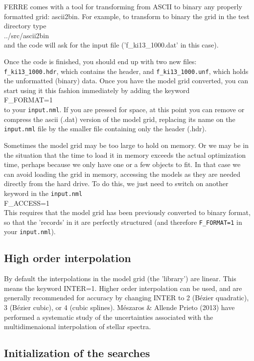 \documentclass[12pt]{article}
\begin{document}
FERRE comes with a tool for transforming from ASCII to
binary any properly formatted grid: ascii2bin. 
For example, to transform to binary the grid in the test directory type \\
../src/ascii2bin \\
and the code will ask for the input file ('f\_ki13\_1000.dat' in this case). 

Once the code is finished, you should end up with two new files: {\tt f\_ki13\_1000.hdr},
which contains the header, and {\tt f\_ki13\_1000.unf}, which holds the unformatted (binary)
data. Once you have the model grid converted, you can start using it this fashion
immediately by adding the keyword \\
F\_FORMAT=1 \\
to your {\tt input.nml}. If you are pressed for space, at this point you can 
remove or compress the ascii (.dat) version of the model grid, replacing its name 
on the {\tt input.nml} file by the smaller file containing only the header (.hdr).

Sometimes the model grid may be too large to hold on memory. Or we may be
in the situation that the time to load it in memory exceeds the actual 
optimization time, perhaps because we only have one or a few objects to fit. In that
case we can avoid loading the grid in memory, accessing the models as they are
needed directly from the hard drive. To do this, we just need to switch on another
keyword in the {\tt input.nml} \\
F\_ACCESS=1\\
This requires that the model grid has been previously converted to binary format, 
so that the 'records' in it are perfectly structured (and therefore {\tt F\_FORMAT=1} 
in your {\tt input.nml}).

\subsection{High order interpolation}

By default the interpolations in the model grid (the 'library') are linear.
This means the keyword INTER=1. Higher order interpolation can be used, and
are generally recommended for accuracy by changing INTER to 2 (B\'ezier quadratic),
3 (B\'ezier cubic), or 4 (cubic splines). M\'eszaros \& Allende Prieto (2013) have
performed a systematic study of the uncertainties associated with the
multidimenaional interpolation of stellar spectra.

\subsection{Initialization of the searches}
\label{init}
\end{document}
